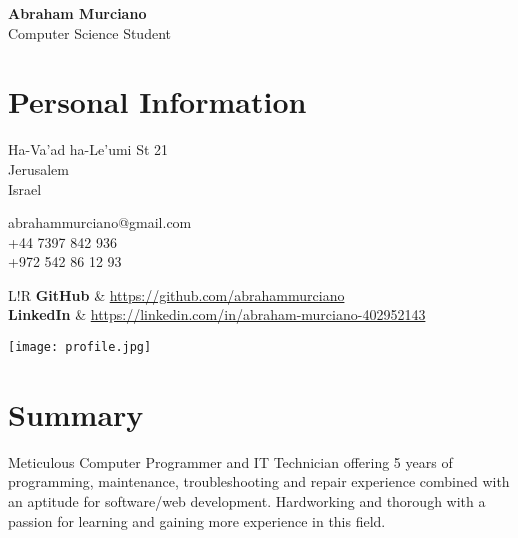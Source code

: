 \documentclass{article}
\newcommand\VRule{\color{lightgray}\vrule width 0.4pt}
\begin{document}
\hspace{-18.4pt}
\begin{minipage}{0.8\textwidth}
	{\bfseries\Huge Abraham Murciano}\vspace{4pt}\\
	{\large Computer Science Student}

	\section*{Personal Information}
	\begin{multicols}{2}
		Ha-Va'ad ha-Le'umi St 21\\
		Jerusalem\\
		Israel
		\columnbreak

		abrahammurciano@gmail.com\\
		+44 7397 842 936\\
		+972 542 86 12 93
		\columnbreak
	\end{multicols}
	\begin{tabular}{L!{\VRule}R}
		\textbf{GitHub}   & \url{https://github.com/abrahammurciano}                 \\
		\textbf{LinkedIn} & \url{https://linkedin.com/in/abraham-murciano-402952143}
	\end{tabular}
\end{minipage}
%
\begin{minipage}{0.2\textwidth}
	\begin{flushright}
		\texttt{[image: profile.jpg]}
	\end{flushright}
\end{minipage}

\section*{Summary}
Meticulous Computer Programmer and IT Technician offering 5 years of programming, maintenance, troubleshooting and repair experience combined with an aptitude for software/web development. Hardworking and thorough with a passion for learning and gaining more experience in this field.
\end{document}
